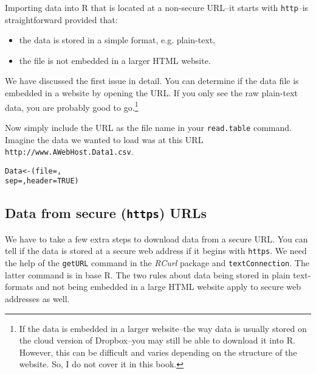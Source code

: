 Importing data into R that is located at a non-secure URL--it starts with {\tt{http}}--is straightforward provided that:

\begin{itemize}
    \item the data is stored in a simple format, e.g. plain-text,
    \item the file is not embedded in a larger HTML website.
\end{itemize}

We have discussed the first issue in detail. You can determine if the data file is embedded in a website by opening the URL. If you only see the raw plain-text data, you are probably good to go.\footnote{If the data is embedded in a larger website--the way data is usually stored on the cloud version of Dropbox--you may still be able to download it into R. However, this can be difficult and varies depending on the structure of the website. So, I do not cover it in this book.}

Now simply include the URL as the file name in your \texttt{read.table} command. Imagine the data we wanted to load was at this URL \texttt{http://www.AWebHost.Data1.csv}.

\begin{knitrout}
\color{fgcolor}\begin{kframe}
\begin{alltt}
Data <- (file = , 
                    sep = , header = TRUE)
\end{alltt}
\end{kframe}
\end{knitrout}


\subsection{Data from secure ({\tt{https}}) URLs}

We have to take a few extra steps to download data from a secure URL. You can tell if the data is stored at a secure web address if it begins with \texttt{https}. We need the help of the \texttt{getURL} command in the {\emph{RCurl}} package \cite[]{R-RCurl} and \texttt{textConnection}. The latter command is in base R. The two rules about data being stored in plain text-formats and not being embedded in a large HTML website apply to secure web addresses as well.

